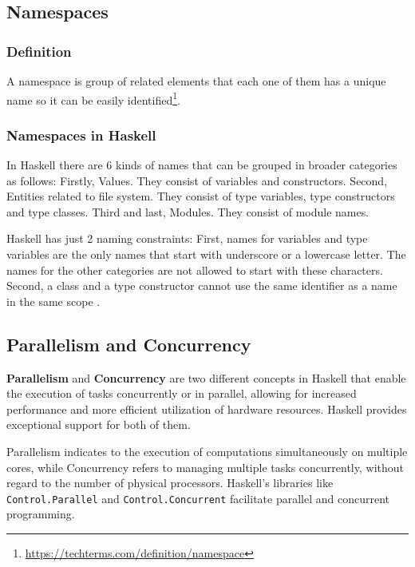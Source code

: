 \documentclass[a4paper, titlepage, twoside]{article}
\begin{document}
\subsection{Namespaces}
\label{sec:org45ac4f0}

\subsubsection{Definition}
\label{sec:org7dcee13}

A namespace is group of related elements that each one of them has a unique name so it can be easily identified\footnote{\url{https://techterms.com/definition/namespace}}.

\subsubsection{Namespaces in Haskell}
\label{sec:orge94abfb}

In Haskell there are 6 kinds of names that can be grouped in broader categories as follows: Firstly, Values. They consist of variables and constructors. Second, Entities related to file system. They consist of type variables, type constructors and type classes. Third and last, Modules. They consist of module names.

Haskell has just 2 naming constraints: First, names for variables and type variables are the only names that start with underscore or a lowercase letter. The names for the other categories are not allowed to start with these characters. Second, a class and a type constructor cannot use the same identifier as a name in the same scope \autocite{marlowHaskell2010Language2010}.

\subsection{Parallelism and Concurrency}
\label{sec:org05c3da7}

\textbf{Parallelism} and \textbf{Concurrency} are two different concepts in Haskell that enable the execution of tasks concurrently or in parallel, allowing for increased performance and more efficient utilization of hardware resources. Haskell provides exceptional support for both of them.

Parallelism indicates to the execution of computations simultaneously on multiple cores, while Concurrency refers to managing multiple tasks concurrently, without regard to the number of physical processors. Haskell's libraries like \texttt{Control.Parallel} and \texttt{Control.Concurrent} facilitate parallel and concurrent programming.
\end{document}

